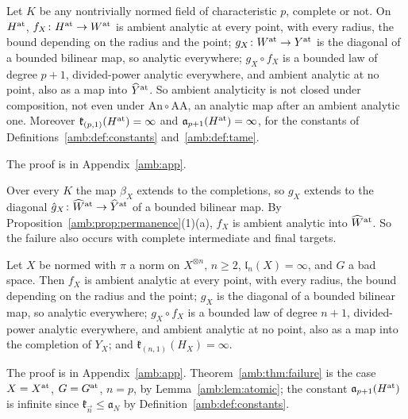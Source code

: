 \begin{theorem}\label{amb:thm:failure}
Let $K$ be any nontrivially normed field of characteristic $p$, complete or not. On $H^{\rm at}$, $f_X\colon H^{\rm at}\to W^{\rm at}$ is ambient analytic at every point, with every radius, the bound depending on the radius and the point; $g_X\colon W^{\rm at}\to Y^{\rm at}$ is the diagonal of a bounded bilinear map, so analytic everywhere; $g_X\circ f_X$ is a bounded law of degree $p+1$, divided-power analytic everywhere, and ambient analytic at no point, also as a map into $\widehat Y^{\rm at}$. So ambient analyticity is not closed under composition, not even under $\mathrm{An}\circ\mathrm{AA}$, an analytic map after an ambient analytic one. Moreover $\mathfrak k_{(p,1)}(H^{\rm at})=\infty$ and $\mathfrak a_{p+1}(H^{\rm at})=\infty$, for the constants of Definitions~\ref{amb:def:constants} and~\ref{amb:def:tame}.
\end{theorem}
The proof is in Appendix~\ref{amb:app}.

Over every $K$ the map $\beta_X$ extends to the completions, so $g_X$ extends to the diagonal $\hat g_X\colon\widehat W^{\rm at}\to\widehat Y^{\rm at}$ of a bounded bilinear map. By Proposition~\ref{amb:prop:permanence}(1)(a), $f_X$ is ambient analytic into $\widehat W^{\rm at}$. So the failure also occurs with complete intermediate and final targets.

\begin{proposition}\label{amb:prop:general-failure}
Let $X$ be normed with $\pi$ a norm on $X^{\otimes n}$, $n\ge2$, $\mathfrak l_n(X)=\infty$, and $G$ a bad space. Then $f_X$ is ambient analytic at every point, with every radius, the bound depending on the radius and the point; $g_X$ is the diagonal of a bounded bilinear map, so analytic everywhere; $g_X\circ f_X$ is a bounded law of degree $n+1$, divided-power analytic everywhere, and ambient analytic at no point, also as a map into the completion of $Y_X$; and $\mathfrak k_{(n,1)}(H_X)=\infty$.
\end{proposition}
The proof is in Appendix~\ref{amb:app}. Theorem~\ref{amb:thm:failure} is the case $X=X^{\rm at}$, $G=G^{\rm at}$, $n=p$, by Lemma~\ref{amb:lem:atomic}; the constant $\mathfrak a_{p+1}(H^{\rm at})$ is infinite since $\mathfrak k_{\vec n}\le\mathfrak a_N$ by Definition~\ref{amb:def:constants}.

